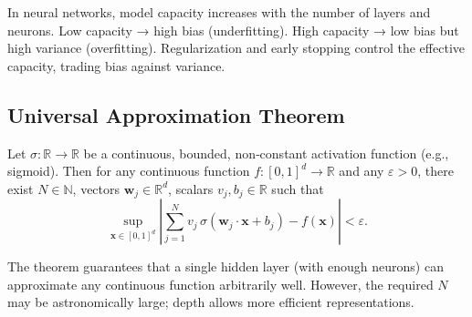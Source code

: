 \documentclass{tufte-handout}
\begin{document}
In neural networks, model capacity increases with the number of layers and neurons. Low capacity → high bias (underfitting). High capacity → low bias but high variance (overfitting). Regularization and early stopping control the effective capacity, trading bias against variance.

\subsection{Universal Approximation Theorem}

\begin{thm}[Cybenko, 1989]
    Let $\sigma: \mathbb{R}\to\mathbb{R}$ be a continuous, bounded, non‑constant activation function (e.g., sigmoid). Then for any continuous function $f: [0,1]^d \to \mathbb{R}$ and any $\varepsilon>0$, there exist $N\in\mathbb{N}$, vectors $\mathbf{w}_j\in\mathbb{R}^d$, scalars $v_j, b_j\in\mathbb{R}$ such that
    \[
    \sup_{\mathbf{x}\in[0,1]^d} \left| \sum_{j=1}^N v_j\,\sigma(\mathbf{w}_j\cdot\mathbf{x} + b_j) - f(\mathbf{x}) \right| < \varepsilon.
    \]
\end{thm}

The theorem guarantees that a single hidden layer (with enough neurons) can approximate any continuous function arbitrarily well. However, the required $N$ may be astronomically large; depth allows more efficient representations.
\end{document}
